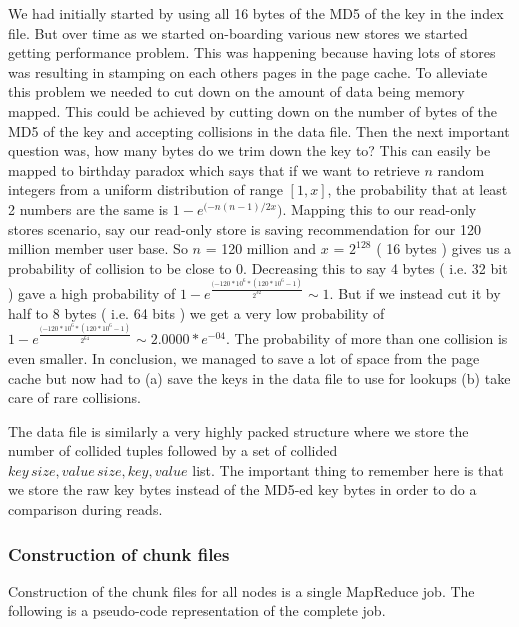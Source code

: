 \documentclass[10pt,twocolumn,preprint,natbib,authoryear]{sigplanconf}
\begin{document}
We had initially started by using all 16 bytes of the MD5 of the key in the index file. But over time as we started on-boarding various new stores we started getting performance problem. This was happening because having lots of stores was resulting in stamping on each others pages in the page cache. To alleviate this problem we needed to cut down on the amount of data being memory mapped. This could be achieved by cutting down on the number of bytes of the MD5 of the key and accepting collisions in the data file. Then the next important question was, how many bytes do we trim down the key to? This can easily be mapped to birthday paradox which says that if we want to retrieve $n$ random integers from a uniform distribution of range $[1, x]$, the probability that at least 2 numbers are the same is  $1 - e^{(-n(n-1)/2x})$. Mapping this to our read-only stores scenario, say our read-only store is saving recommendation for our 120 million member user base. So $n$ = 120 million and $x$ = $2^{128}$ ( 16 bytes ) gives us a probability of collision to be close to 0. Decreasing this to say 4 bytes ( i.e. 32 bit ) gave a high probability of $1 - e^{\frac{(-120*10^{6} * ( 120*10^{6} - 1)}{2^{32}}} \sim 1$. But if we instead cut it by half to 8 bytes ( i.e. 64 bits ) we get a very low probability of $1 - e^{\frac{(-120*10^{6} * (120*10^{6} - 1)} { 2^{64}}} \sim 2.0000 * e^{-04}$. The probability of more than one collision is even smaller. In conclusion, we managed to save a lot of space from the page cache but now had to (a) save the keys in the data file to use for lookups (b) take care of rare collisions.  

The data file is similarly a very highly packed structure where we store the number of collided tuples followed by a set of collided $key\,size, value\,size, key, value$ list. The important thing to remember here is that we store the raw key bytes instead of the MD5-ed key bytes in order to do a comparison during reads. 

\subsubsection{Construction of chunk files}

Construction of the chunk files for all nodes is a single MapReduce job. The following is a pseudo-code representation of the complete job. 
\end{document}
